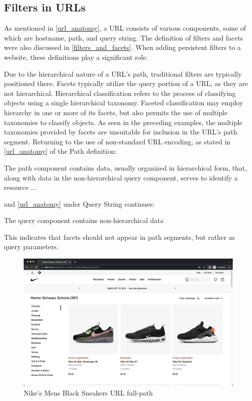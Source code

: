 \subsection*{Filters in URLs}
As mentioned in \autoref{url_anatomy}, a URL consists of various components, some of which are hostname, path, and query string. The definition of filters and facets were also discussed in \autoref{filters_and_facets}. When adding persistent filters to a website, these definitions play a significant role.

Due to the hierarchical nature of a URL's path, traditional filters are typically positioned there. Facets typically utilize the query portion of a URL, as they are not hierarchical. Hierarchical classification refers to the process of classifying objects using a single hierarchical taxonomy. Faceted classification may employ hierarchy in one or more of its facets, but also permits the use of multiple taxonomies to classify objects. As seen in the preceding examples, the multiple taxonomies provided by facets are unsuitable for inclusion in the URL's path segment. Returning to the use of non-standard URL encoding, as stated in \autoref{url_anatomy} of the Path definition:

\begin{displayquote}
  The path component contains data, usually organized in hierarchical form, that, along with data in the non-hierarchical query component, serves to identify a resource ...
\end{displayquote}

\noindent and \autoref{url_anatomy} under Query String continues:

\begin{displayquote}
  The query component contains non-hierarchical data
\end{displayquote}

\noindent This indicates that facets should not appear in path segments, but rather as query parameters.

\begin{figure}[H]
  \includegraphics[width=\textwidth]{assets/screenshot_nike_website.png}
  \caption{Nike's Mens Black Sneakers URL full-path}
  \label{fig:nikeMensBlackSneakersUrl}
\end{figure}

